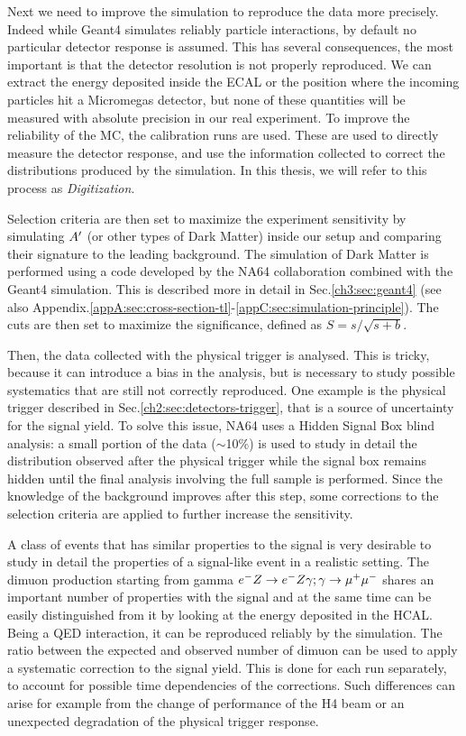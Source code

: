 Next we need to improve the simulation to reproduce the data more precisely. Indeed while Geant4 simulates reliably particle interactions, by default no particular detector response is assumed. This has several consequences, the most important is that the detector resolution is not properly reproduced. We can extract the energy deposited inside the ECAL or the position where the incoming particles hit a Micromegas detector, but none of these quantities will be measured with absolute precision in our real experiment. To improve the reliability of the MC, the calibration runs are used. These are used to directly measure the detector response, and use the information collected to correct the distributions produced by the simulation. In this thesis, we will refer to this process as \textit{Digitization}.

Selection criteria are then set to maximize the experiment sensitivity by simulating $A'$ (or other types of Dark Matter) inside our setup and comparing their signature to the leading background. The simulation of Dark Matter is performed using a code developed by the NA64 collaboration combined with the Geant4 simulation. This is described more in detail in Sec.\ref{ch3:sec:geant4} (see also Appendix.\ref{appA:sec:cross-section-tl}-\ref{appC:sec:simulation-principle}). The cuts are then set to maximize the significance, defined as $S = s/\sqrt{s+b}$.

Then, the data collected with the physical trigger is analysed. This is tricky, because it can introduce a bias in the analysis, but is necessary to study possible systematics that are still not correctly reproduced. 
One example is the physical trigger described in Sec.\ref{ch2:sec:detectors-trigger}, that is a source of uncertainty for the signal yield. To solve this issue, NA64 uses a Hidden Signal Box blind analysis\cite{blind-analysis}: a small portion of the data ($\sim$10\%) is used to study in detail the distribution observed after the physical trigger while the signal box remains hidden until the final analysis involving the full sample is performed. Since the knowledge of the background improves after this step, some corrections to the selection criteria are applied to further increase the sensitivity.

A class of events that has similar properties to the signal is very desirable to study in detail the properties of a signal-like event in a realistic setting.  The dimuon production starting from gamma $e^- Z \to e^- Z \gamma; \gamma \to \mu^+ \mu^-$ shares an important number of properties with the signal and at the same time can be easily distinguished from it by looking at the energy deposited in the HCAL. Being a QED interaction, it can be reproduced reliably by the simulation. The ratio between the expected and observed number of dimuon can be used to apply a systematic correction to the signal yield. This is done for each run separately, to account for possible time dependencies of the corrections. Such differences can arise for example from the change of performance of the H4 beam or an unexpected degradation of the physical trigger response.

